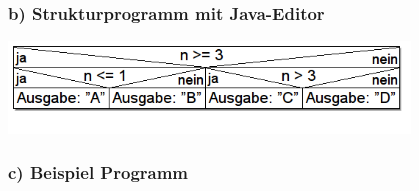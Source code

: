 \begin{frame}[fragile]%
\frametitle{b) Strukturprogramm mit Java-Editor}%
\begin{center}

\includegraphics[width=0.8\textwidth]{anweis-1/Bilder/Struktogramm_b}
\end{center}

\end{frame}


\begin{frame}[fragile]%
 \frametitle{c) Beispiel Programm}%

\end{frame}
